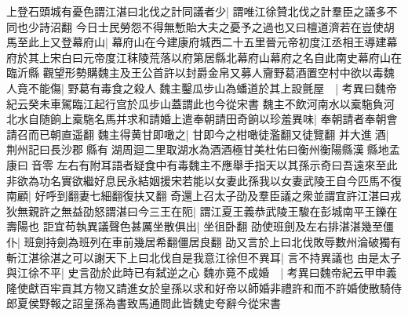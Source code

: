 上登石頭城有憂色謂江湛曰北伐之計同議者少|{
	謂唯江徐贊北伐之計羣臣之議多不同也少詩沼翻}
今日士民勞怨不得無慙貽大夫之憂予之過也又曰檀道濟若在豈使胡馬至此上又登幕府山|{
	幕府山在今建康府城西二十五里晉元帝初度江丞相王導建幕府於其上宋白曰元帝度江秣陵荒落以府第居縣北幕府山幕府之名自此南史幕府山在臨沂縣}
觀望形勢購魏主及王公首許以封爵金帛又募人齎野葛酒置空村中欲以毒魏人竟不能傷|{
	野葛有毒食之殺人}
魏主鑿瓜步山為蟠道於其上設氈屋　|{
	考異曰魏帝紀云癸未車駕臨江起行宫於瓜步山蓋謂此也今從宋書}
魏主不飲河南水以槖駞負河北水自随餉上槖駞名馬并求和請婚上遣奉朝請田奇餉以珍羞異味|{
	奉朝請者奉朝會請召而已朝直遥翻}
魏主得黄甘即噉之|{
	甘即今之柑噉徒濫翻又徒覽翻}
并大進酒|{
	荆州記曰長沙郡縣有湖周迴二里取湖水為酒酒極甘美杜佑曰衡州衡陽縣漢縣地孟康曰音零}
左右有附耳語者疑食中有毒魏主不應舉手指天以其孫示奇曰吾遠來至此非欲為功名實欲繼好息民永結姻援宋若能以女妻此孫我以女妻武陵王自今匹馬不復南顧|{
	好呼到翻妻七細翻復扶又翻}
奇還上召太子劭及羣臣議之衆並謂宜許江湛曰戎狄無親許之無益劭怒謂湛曰今三王在阨|{
	謂江夏王義恭武陵王駿在彭城南平王鑠在壽陽也}
詎宜苟執異議聲色甚厲坐散俱出|{
	坐徂卧翻}
劭使班劍及左右排湛湛幾至僵仆|{
	班劍持劍為班列在車前幾居希翻僵居良翻}
劭又言於上曰北伐敗辱數州淪破獨有斬江湛徐湛之可以謝天下上曰北伐自是我意江徐但不異耳|{
	言不持異議也}
由是太子與江徐不平|{
	史言劭於此時已有弑逆之心}
魏亦竟不成婚　|{
	考異曰魏帝紀云甲申義隆使獻百牢貢其方物又請進女於皇孫以求和好帝以師婚非禮許和而不許婚使散騎侍郎夏侯野報之詔皇孫為書致馬通問此皆魏史夸辭今從宋書}


